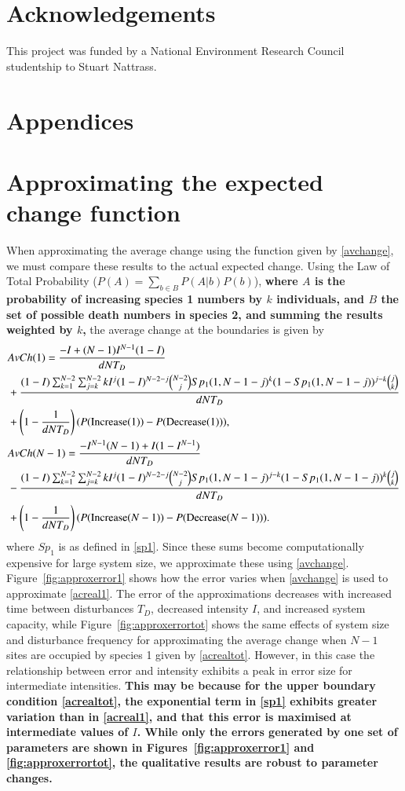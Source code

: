 \section*{Acknowledgements}
This project was funded by a National Environment Research Council studentship to Stuart Nattrass.

\section*{Appendices}

\bappendix
\section{Approximating the expected change function}
\label{app2a}
 When approximating the average change using the function given by \eqref{avchange}, we must compare these results to the actual expected change. Using the Law of Total Probability ($P(A)=\sum_{b \in B} P(A|b)P(b)$), \textbf{where $A$ is the probability of increasing species 1 numbers by $k$ individuals, and $B$ the set of possible death numbers in species 2, and summing the results weighted by $k$,} the average change at the boundaries is given by
\begin{align}
\label{acreal1}&AvCh(1)=\frac{-I+(N-1)I^{N-1}(1-I)}{dNT_D}\\
&+\frac{(1-I)\sum_{k=1}^{N-2}\sum_{j=k}^{N-2}k I^j(1-I)^{N-2-j}{N-2\choose j} Sp_1(1,N-1-j)^k(1-Sp_1(1,N-1-j))^{j-k} {j \choose k}}{dNT_D} \notag \\
 &+ \left(1-\frac{1}{dNT_D}\right)(P(\text{Increase}(1))-P(\text{Decrease}(1))), \notag \\
 \label{acrealtot}&AvCh(N-1)= \frac{-I^{N-1}(N-1) +I(1-I^{N-1})}{dNT_D} \\
 &-\frac{(1-I)\sum_{k=1}^{N-2}\sum_{j=k}^{N-2}k I^j(1-I)^{N-2-j}{N-2\choose j} Sp_1(1,N-1-j)^{j-k}(1-Sp_1(1,N-1-j))^{k} {j \choose k}}{dNT_D} \notag \\
 &+ \left(1-\frac{1}{dNT_D}\right)(P(\text{Increase}(N-1))-P(\text{Decrease}(N-1))). \notag
  \end{align}
where $Sp_1$ is as defined in \eqref{sp1}. Since these sums become computationally expensive for large system size, we approximate these using \eqref{avchange}. Figure~\ref{fig:approxerror1} shows how the error varies when \eqref{avchange} is used to approximate \eqref{acreal1}. The error of the approximations decreases with increased time between disturbances $T_D$, decreased intensity $I$, and increased system capacity, while Figure~\ref{fig:approxerrortot} shows the same effects of system size and disturbance frequency for approximating the average change when $N-1$ sites are occupied by species 1 given by \eqref{acrealtot}. However, in this case the relationship between error and intensity exhibits a peak in error size for intermediate intensities. \textbf{This may be because for the upper boundary condition \eqref{acrealtot}, the exponential term in \eqref{sp1} exhibits greater variation than in \eqref{acreal1}, and that this error is maximised at intermediate values of $I$. While only the errors generated by one set of parameters are shown in Figures~\ref{fig:approxerror1} and \ref{fig:approxerrortot}, the qualitative results are robust to parameter changes.}

